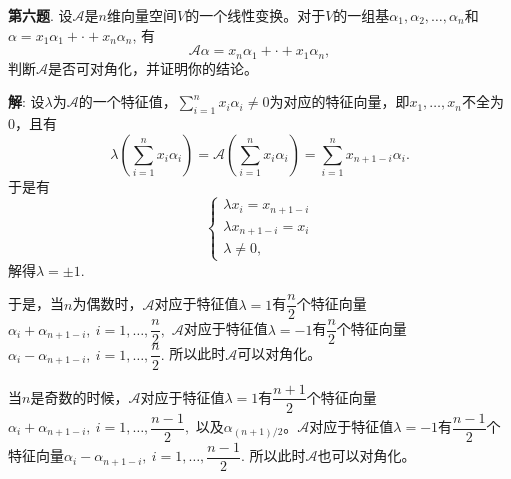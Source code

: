\newpageorvspace


{\bf 第六题}. 设$\mathscr{A}$是$n$维向量空间$V$的一个线性变换。对于$V$的一组基$\alpha_1, \alpha_2, \ldots, \alpha_n$和$\alpha = x_1\alpha_1 + \cdot + x_n\alpha_n$, 有
$$\mathscr{A}\alpha = x_n\alpha_1 + \cdot + x_1\alpha_n,$$
判断$\mathscr{A}$是否可对角化，并证明你的结论。

{\bf 解}: 设$\lambda$为$\mathscr{A}$的一个特征值，$\sum\limits_{i=1}^n x_i \alpha_i \neq 0$为对应的特征向量，即$x_1,\ldots,x_n$不全为0，且有
$$\lambda(\sum\limits_{i=1}^n x_i \alpha_i) = \mathscr{A}(\sum\limits_{i=1}^n x_i \alpha_i) = \sum\limits_{i=1}^n x_{n+1-i} \alpha_i.$$
于是有
$$
\begin{cases}
\lambda x_i = x_{n+1-i} \\
\lambda x_{n+1-i} = x_i \\
\lambda \neq 0,
\end{cases}
$$
解得$\lambda = \pm 1$. 

于是，当$n$为偶数时，$\mathscr{A}$对应于特征值$\lambda = 1$有$\dfrac{n}{2}$个特征向量$\alpha_i + \alpha_{n+1-i}, ~ i = 1, \ldots, \dfrac{n}{2},$ $\mathscr{A}$对应于特征值$\lambda = -1$有$\dfrac{n}{2}$个特征向量$\alpha_i - \alpha_{n+1-i}, ~ i = 1, \ldots, \dfrac{n}{2}.$ 所以此时$\mathscr{A}$可以对角化。

当$n$是奇数的时候，$\mathscr{A}$对应于特征值$\lambda = 1$有$\dfrac{n+1}{2}$个特征向量$\alpha_i + \alpha_{n+1-i}, ~ i = 1, \ldots, \dfrac{n-1}{2},$ 以及$\alpha_{(n+1)/2}$。$\mathscr{A}$对应于特征值$\lambda = -1$有$\dfrac{n-1}{2}$个特征向量$\alpha_i - \alpha_{n+1-i}, ~ i = 1, \ldots, \dfrac{n-1}{2}.$ 所以此时$\mathscr{A}$也可以对角化。

